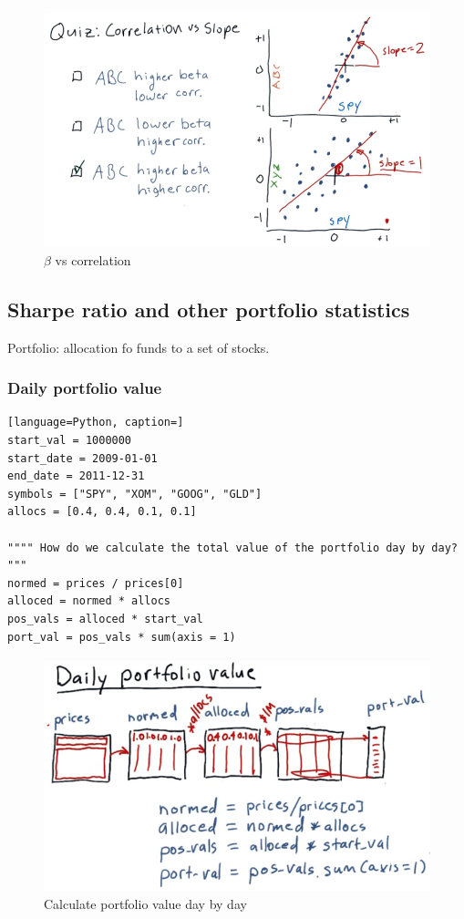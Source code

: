 \documentclass[12pt]{article}
\begin{document}
\begin{figure}[!ht]
\centering
\includegraphics[scale=0.4]{fig/fig18}
\caption{$\beta$ vs correlation}
\end{figure}

\subsection{Sharpe ratio and other portfolio statistics}

\noindent
Portfolio: allocation fo funds to a set of stocks.

\subsubsection{Daily portfolio value} 

\begin{lstlisting}[language=Python, caption=]
start_val = 1000000
start_date = 2009-01-01
end_date = 2011-12-31
symbols = ["SPY", "XOM", "GOOG", "GLD"]
allocs = [0.4, 0.4, 0.1, 0.1]

"""" How do we calculate the total value of the portfolio day by day? """
normed = prices / prices[0]
alloced = normed * allocs
pos_vals = alloced * start_val
port_val = pos_vals * sum(axis = 1)
\end{lstlisting}

\begin{figure}[!ht]
\centering
\includegraphics[scale=0.5]{fig/fig19}
\caption{Calculate portfolio value day by day}
\end{figure}
\end{document}
